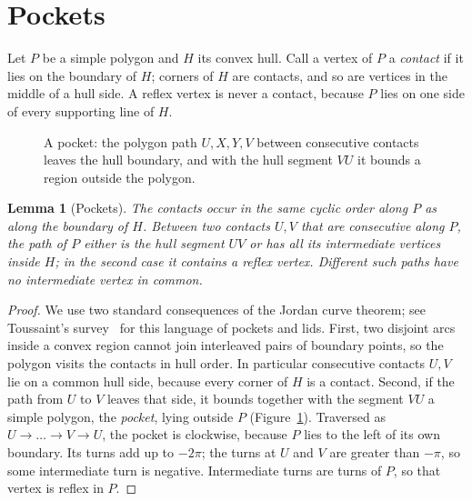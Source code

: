 \documentclass[11pt]{article}
\newtheorem{lemma}{Lemma}
\theoremstyle{remark}
\begin{document}
\section{Pockets}

Let $P$ be a simple polygon and $H$ its convex hull. Call a vertex of $P$ a \emph{contact}
if it lies on the boundary of $H$; corners of $H$ are contacts, and so are vertices in
the middle of a hull side. A reflex vertex is never a contact, because $P$ lies on one
side of every supporting line of $H$.

\begin{figure}[ht]
\centering
{}
\caption{A pocket: the polygon path $U,X,Y,V$ between consecutive contacts leaves the hull
boundary, and with the hull segment $VU$ it bounds a region outside the polygon.}
\label{fig:pocket}
\end{figure}

\begin{lemma}[Pockets]\label{lem:pockets}
The contacts occur in the same cyclic order along $P$ as along the boundary of $H$.
Between two contacts $U,V$ that are consecutive along $P$, the path of $P$ either is the
hull segment $UV$ or has all its intermediate vertices inside $H$; in the second case it
contains a reflex vertex. Different such paths have no intermediate vertex in common.
\end{lemma}

\begin{proof}
We use two standard consequences of the Jordan curve theorem; see Toussaint's
survey~\cite{Toussaint} for this language of pockets and lids. First, two disjoint arcs
inside a convex region cannot join interleaved pairs of boundary points, so the polygon
visits the contacts in hull order. In particular consecutive contacts $U,V$ lie on a
common hull side, because every corner of $H$ is a contact. Second, if the path from $U$
to $V$ leaves that side, it bounds together with the segment $VU$ a simple polygon, the
\emph{pocket}, lying outside $P$ (Figure~\ref{fig:pocket}). Traversed as $U\to\dots\to V\to U$,
the pocket is clockwise, because $P$ lies to the left of its own boundary. Its turns add up
to $-2\pi$; the turns at $U$ and $V$ are greater than $-\pi$, so some intermediate turn is
negative. Intermediate turns are turns of $P$, so that vertex is reflex in $P$.
\end{proof}
\end{document}
